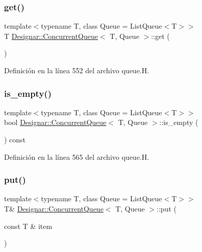 \subsubsection{\texorpdfstring{get()}{get()}}
{\footnotesize\ttfamily template$<$typename T, class Queue = List\+Queue$<$\+T$>$$>$ \\
T \hyperlink{class_designar_1_1_concurrent_queue}{Designar\+::\+Concurrent\+Queue}$<$ T, Queue $>$\+::get (\begin{DoxyParamCaption}{ }\end{DoxyParamCaption})\hspace{0.3cm}{\ttfamily [inline]}}



Definición en la línea 552 del archivo queue.\+H.

\mbox{\label{class_designar_1_1_concurrent_queue_a7e73feaae8bc8aae37145a2484f28ea2}} 
\subsubsection{\texorpdfstring{is\+\_\+empty()}{is\_empty()}}
{\footnotesize\ttfamily template$<$typename T, class Queue = List\+Queue$<$\+T$>$$>$ \\
bool \hyperlink{class_designar_1_1_concurrent_queue}{Designar\+::\+Concurrent\+Queue}$<$ T, Queue $>$\+::is\+\_\+empty (\begin{DoxyParamCaption}{ }\end{DoxyParamCaption}) const\hspace{0.3cm}{\ttfamily [inline]}}



Definición en la línea 565 del archivo queue.\+H.

\mbox{\label{class_designar_1_1_concurrent_queue_a0ed3cfb2755c04be0f55f485b71637b9}} 
\subsubsection{\texorpdfstring{put()}{put()}\hspace{0.1cm}{\footnotesize\ttfamily [1/2]}}
{\footnotesize\ttfamily template$<$typename T, class Queue = List\+Queue$<$\+T$>$$>$ \\
T\& \hyperlink{class_designar_1_1_concurrent_queue}{Designar\+::\+Concurrent\+Queue}$<$ T, Queue $>$\+::put (\begin{DoxyParamCaption}\item[{const T \&}]{item }\end{DoxyParamCaption})\hspace{0.3cm}{\ttfamily [inline]}}



